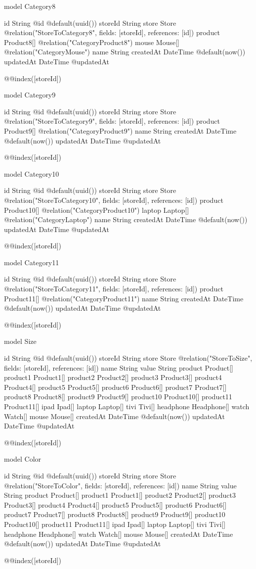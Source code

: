 model Category8 {
  id        String     @id @default(uuid())
  storeId   String
  store     Store      @relation("StoreToCategory8", fields: [storeId], references: [id])
  product   Product8[] @relation("CategoryProduct8")
  mouse      Mouse[]     @relation("CategoryMouse")
  name      String
  createdAt DateTime   @default(now())
  updatedAt DateTime   @updatedAt

  @@index([storeId])
}

model Category9 {
  id        String     @id @default(uuid())
  storeId   String
  store     Store      @relation("StoreToCategory9", fields: [storeId], references: [id])
  product   Product9[] @relation("CategoryProduct9")
  name      String
  createdAt DateTime   @default(now())
  updatedAt DateTime   @updatedAt

  @@index([storeId])
}

model Category10 {
  id        String   @id @default(uuid())
  storeId   String
  store     Store    @relation("StoreToCategory10", fields: [storeId], references: [id])
  product   Product10[] @relation("CategoryProduct10")
  laptop     Laptop[]    @relation("CategoryLaptop")
  name      String
  createdAt DateTime @default(now())
  updatedAt DateTime @updatedAt

  @@index([storeId])
}

model Category11 {
  id        String   @id @default(uuid())
  storeId   String
  store     Store    @relation("StoreToCategory11", fields: [storeId], references: [id])
  product   Product11[] @relation("CategoryProduct11")
  name      String
  createdAt DateTime @default(now())
  updatedAt DateTime @updatedAt

  @@index([storeId])
}

model Size {
  id        String      @id @default(uuid())
  storeId   String
  store     Store       @relation("StoreToSize", fields: [storeId], references: [id])
  name      String
  value     String
  product   Product[]
  product1  Product1[]
  product2  Product2[]
  product3  Product3[]
  product4  Product4[]
  product5  Product5[]
  product6  Product6[]
  product7  Product7[]
  product8  Product8[]
  product9  Product9[]
  product10  Product10[]
  product11  Product11[]
  ipad      Ipad[]
  laptop    Laptop[]
  tivi      Tivi[]
  headphone Headphone[]
  watch     Watch[]
  mouse     Mouse[]
  createdAt DateTime @default(now())
  updatedAt DateTime @updatedAt

  @@index([storeId])
}

model Color {
  id        String      @id @default(uuid())
  storeId   String
  store     Store       @relation("StoreToColor", fields: [storeId], references: [id])
  name      String
  value     String
  product   Product[]
  product1  Product1[]
  product2  Product2[]
  product3  Product3[]
  product4  Product4[]
  product5  Product5[]
  product6  Product6[]
  product7  Product7[]
  product8  Product8[]
  product9  Product9[]
  product10  Product10[]
  product11  Product11[]
  ipad      Ipad[]
  laptop    Laptop[]
  tivi      Tivi[]
  headphone Headphone[]
  watch     Watch[]
  mouse     Mouse[]
  createdAt DateTime    @default(now())
  updatedAt DateTime    @updatedAt

  @@index([storeId])
}

